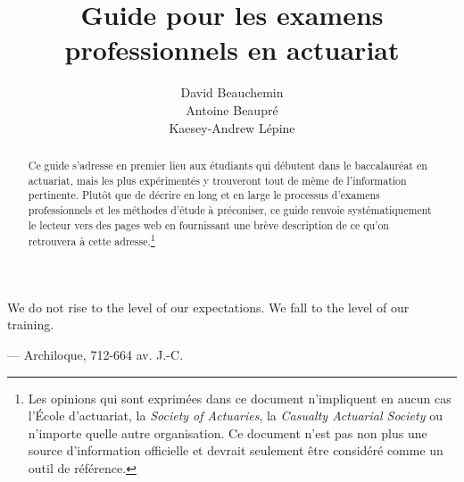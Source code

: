 \documentclass[11pt,french]{article}
\title{\vspace{2cm}
	   Guide pour les examens professionnels en actuariat
       \vspace{6cm}}
\author{David Beauchemin \\ 
				Antoine Beaupré \\ 
				Kaesey-Andrew Lépine \vspace{4cm}}
\begin{document}
\maketitle
\thispagestyle{fancy}

\newpage

\newpage

\begin{abstract}
Ce guide s'adresse en premier lieu aux étudiants qui débutent dans le baccalauréat en actuariat, mais les plus expérimentés y trouveront tout de même de l'information pertinente. Plutôt que de décrire en long et en large le processus d'examens professionnels et les méthodes d'étude à préconiser, ce guide renvoie systématiquement le lecteur vers des pages web en fournissant une brève description de ce qu'on retrouvera à cette adresse.\footnote{Les opinions qui sont exprimées dans ce document n'impliquent en aucun cas l'École d'actuariat, la \emph{Society of Actuaries}, la \emph{Casualty Actuarial Society} ou n'importe quelle autre organisation. Ce document n'est pas non plus une source d'information officielle et devrait seulement être considéré comme un outil de référence.}{\tiny} 
\end{abstract}

\clearpage
{}
\begin{center}
\begin{minipage}{.6\textwidth}
\epigraph{We do not rise to the level of our expectations. We fall to the level of our training.}{--- \textup{Archiloque}, 712-664 av. J.-C.}
\end{minipage}
\end{center}
\clearpage

\newpage
\tableofcontents

\newpage
{}
\setcounter{page}{1}








\end{document}
